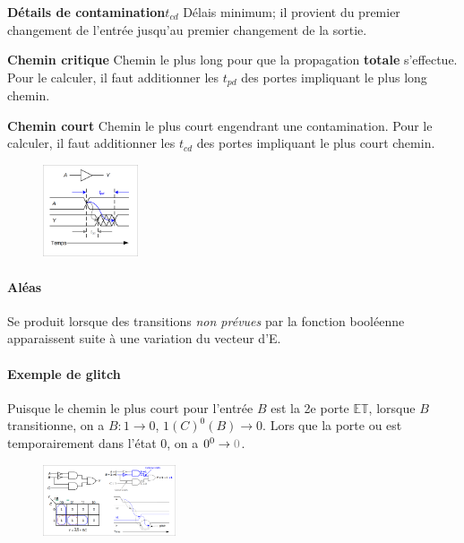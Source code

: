 \documentclass{report}
\begin{document}
\begin{multicols*}{3}
   \noindent \textbf{Détails de contamination$t_{cd}$}  
   Délais minimum; il provient du premier changement de l'entrée 
   jusqu'au premier changement de la sortie. 


   \noindent \textbf{Chemin critique}  
   Chemin le plus long pour que la propagation \textbf{totale} s'effectue. Pour le 
   calculer, il faut additionner les $t_{pd}$ des portes impliquant 
   le plus long chemin. 


   \noindent \textbf{Chemin court}  
   Chemin le plus court engendrant une contamination. Pour le 
   calculer, il faut additionner les $t_{cd}$ des portes impliquant 
   le plus court chemin. 


   \begin{figure}[H]
    \begin{center}
      \includegraphics[width=0.25\textwidth]{Glitch.png}
    \end{center}
   \end{figure}


   \paragraph{Aléas}
   Se produit lorsque des transitions \textit{non prévues} par 
   la fonction booléenne apparaissent suite à une variation 
   du vecteur d'E. 


   \paragraph{Exemple de glitch}
   Puisque le chemin le plus court pour l'entrée $B$ 
   est la 2e porte $\mathbb{ET}$, lorsque $B$ 
   transitionne, on a  $B \colon 1 \rightarrow 0$,
   $1(C)^0(B) \rightarrow 0$. Lors que la porte 
   ou est temporairement dans l'état $0$, on a 
   $0^0 \rightarrow \textcolor{gray}{0}$.   


   \begin{figure}[H]
    \begin{center}
      \includegraphics[width=0.35\textwidth]{ExempleGlitch.png}
    \end{center}
   \end{figure}


\end{multicols*}
\end{document}
